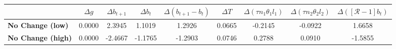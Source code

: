\begin{tiny}\begin{tabular}{|l|c|c|c|c|c|c|c|c|}
\hline
&\textbf{$\Delta g$}&\textbf{$\Delta b_{t+1}$}&\textbf{$\Delta b_{t}$}&\textbf{$\Delta (b_{t+1}-b_t)$}&\textbf{$\Delta T$}&\textbf{$\Delta (\tau n_1\theta_1 l_1 )$}&\textbf{$\Delta (\tau n_2\theta_2 l_2)$}&\textbf{$\Delta ([\mathcal{R}-1]b_t)$}\\\hline
\textbf{No Change (low)}&0.0000&2.3945&1.1019&1.2926&0.0665&-0.2145&-0.0922&1.6658\\\hline
\textbf{No Change (high)}&0.0000&-2.4667&-1.1765&-1.2903&0.0746&0.2788&0.0910&-1.5855\\\hline
\end{tabular}
\end{tiny}